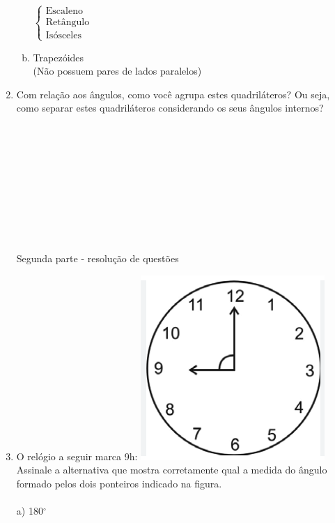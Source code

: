 \documentclass[a4paper,14pt]{article}
\begin{document}
\begin{multicols}{2}
\begin{enumerate}
\begin{enumerate}[a)]
            	$\begin{cases}
            		\text{Escaleno} \\
            		\text{Retângulo} \\
            		\text{Isósceles}
            	\end{cases}$
            	\item Trapezóides \\
            	(Não possuem pares de lados paralelos)
            \end{enumerate}
        	\item Com relação aos ângulos, como você agrupa estes quadriláteros? Ou seja, como separar estes quadriláteros considerando os seus ângulos internos? \\\\\\\\\\\\\\\\\\\\\\
        	Segunda parte - resolução de questões 
        	\item O relógio a seguir marca 9h:
        	\includegraphics[width=1\linewidth]{1MMA01_imagens/imagem01}
        	Assinale a alternativa que mostra corretamente qual a medida do ângulo formado pelos dois ponteiros indicado na figura. \\\\
        	a) 180$^\circ$
        	

\end{enumerate}
\end{multicols}
\end{document}

